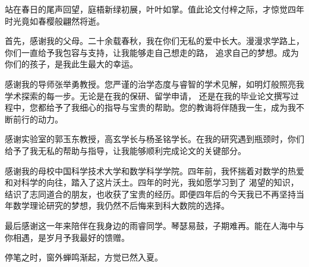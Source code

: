 
\begin{acknowledgements}

站在春日的尾声回望，庭梧新绿初展，叶叶如掌。值此论文付梓之际，才惊觉四年时光竟如春樱般翩然将逝。

首先，感谢我的父母。二十余载春秋，我在你们无私的爱中长大。漫漫求学路上，你们一直给予我包容与支持，让我能够走自己想走的路，
追求自己的梦想。成为你们的孩子，是我此生最大的幸运。

感谢我的导师张举勇教授。您严谨的治学态度与睿智的学术见解，如明灯般照亮我学术探索的每一步。无论是在我的保研、留学申请，
还是在我的毕业论文撰写过程中，您都给予了我细心的指导与宝贵的帮助。您的教诲将伴随我一生，成为我不断前行的动力。

感谢实验室的郭玉东教授，高玄学长与杨圣铭学长。在我的研究遇到瓶颈时，你们给予了我无私的帮助与指导，让我能够顺利完成论文的关键部分。

感谢我的母校中国科学技术大学和数学科学学院。四年前，我怀揣着对数学的热爱和对科学的向往，踏入了这片沃土。四年的时光，我如愿学习到了
渴望的知识，结识了志同道合的朋友，也收获了宝贵的经历。即便四年后的今天我已不再坚持当年数学理论研究的梦想，我仍然不后悔来到科大数院的选择。

最后感谢这一年来陪伴在我身边的雨睿同学。琴瑟易鼓，子期难再。能在人海中与你相遇，是岁月予我最好的馈赠。

停笔之时，窗外蝉鸣渐起，方觉已然入夏。

\end{acknowledgements}
